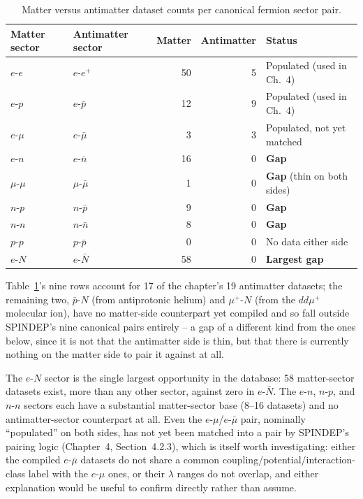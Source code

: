 \documentclass[main]{subfiles}
\begin{document}
\begin{table}[h]
\centering
\begin{tabular}{@{}l l r r >{\raggedright\arraybackslash}p{3.2cm}@{}}
\toprule
Matter sector & Antimatter sector & Matter & Antimatter & Status \\
\midrule
$e$-$e$     & $e$-$e^+$      & 50 & 5 & Populated (used in Ch.~4) \\
$e$-$p$     & $e$-$\bar p$   & 12 & 9 & Populated (used in Ch.~4) \\
$e$-$\mu$   & $e$-$\bar\mu$  & 3  & 3 & Populated, not yet matched \\
$e$-$n$     & $e$-$\bar n$   & 16 & 0 & \textbf{Gap} \\
$\mu$-$\mu$ & $\mu$-$\bar\mu$& 1  & 0 & \textbf{Gap} (thin on both sides) \\
$n$-$p$     & $n$-$\bar p$   & 9  & 0 & \textbf{Gap} \\
$n$-$n$     & $n$-$\bar n$   & 8  & 0 & \textbf{Gap} \\
$p$-$p$     & $p$-$\bar p$   & 0  & 0 & No data either side \\
$e$-$N$     & $e$-$\bar N$   & 58 & 0 & \textbf{Largest gap} \\
\bottomrule
\end{tabular}
\caption{Matter versus antimatter dataset counts per canonical fermion sector pair.}
\label{tab:sector-gaps}
\end{table}

Table~\ref{tab:sector-gaps}'s nine rows account for 17 of the chapter's 19
antimatter datasets; the remaining two, $\bar p$-$N$ (from antiprotonic
helium) and $\mu^+$-$N$ (from the $dd\mu^+$ molecular ion), have no
matter-side counterpart yet compiled and so fall outside SPINDEP's nine
canonical pairs entirely -- a gap of a different kind from the ones below,
since it is not that the antimatter side is thin, but that there is
currently nothing on the matter side to pair it against at all.

The $e$-$N$ sector is the single largest opportunity in the database: 58
matter-sector datasets exist, more than any other sector, against zero in
$e$-$\bar N$. The $e$-$n$, $n$-$p$, and $n$-$n$ sectors each have a
substantial matter-sector base (8--16 datasets) and no antimatter-sector
counterpart at all. Even the $e$-$\mu$/$e$-$\bar\mu$ pair, nominally
``populated'' on both sides, has not yet been matched into a pair by
SPINDEP's pairing logic (Chapter~4, Section~4.2.3), which is itself worth
investigating: either the compiled $e$-$\bar\mu$ datasets do not share a
common coupling/potential/interaction-class label with the $e$-$\mu$ ones,
or their $\lambda$ ranges do not overlap, and either explanation would be
useful to confirm directly rather than assume.
\end{document}
